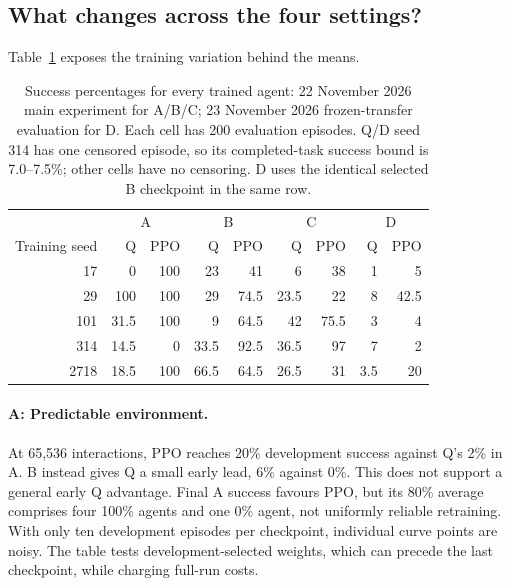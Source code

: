 \subsection{What changes across the four settings?}
Table~\ref{tab:part2-seeds} exposes the training variation behind the means.

\begin{table}[htbp]
\centering\small\setlength{\tabcolsep}{5pt}
\begin{tabular}{@{}r*{4}{rr}@{}}
\toprule
& \multicolumn{2}{c}{A} & \multicolumn{2}{c}{B} & \multicolumn{2}{c}{C} & \multicolumn{2}{c}{D} \\
Training seed & Q & PPO & Q & PPO & Q & PPO & Q & PPO \\
\midrule
17   & 0 & 100 & 23 & 41 & 6 & 38 & 1 & 5 \\
29   & 100 & 100 & 29 & 74.5 & 23.5 & 22 & 8 & 42.5 \\
101  & 31.5 & 100 & 9 & 64.5 & 42 & 75.5 & 3 & 4 \\
314  & 14.5 & 0 & 33.5 & 92.5 & 36.5 & 97 & 7 & 2 \\
2718 & 18.5 & 100 & 66.5 & 64.5 & 26.5 & 31 & 3.5 & 20 \\
\bottomrule
\end{tabular}
\caption{Success percentages for every trained agent: 22 November 2026
main experiment for A/B/C; 23 November 2026 frozen-transfer evaluation for D.
Each cell has 200 evaluation episodes. Q/D seed 314 has one censored episode,
so its completed-task success bound is 7.0--7.5\%; other cells have no censoring.
D uses the identical selected B checkpoint in the same row.}
\label{tab:part2-seeds}
\end{table}

\paragraph{A: Predictable environment.}
At 65,536 interactions, PPO reaches 20\% development success against Q's 2\%
in A. B instead gives Q a small early lead, 6\% against 0\%. This does not
support a general early Q advantage. Final A success favours PPO, but its
80\% average comprises four 100\% agents and one 0\% agent, not uniformly
reliable retraining. With only ten development episodes per checkpoint,
individual curve points are noisy. The table tests development-selected
weights, which can precede the last checkpoint, while charging full-run costs.

